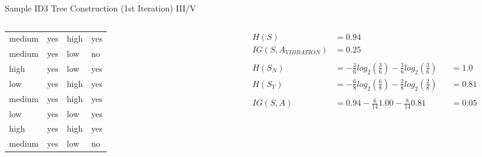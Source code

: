 \documentclass[document.tex]{subfiles}
\begin{document}
\begin{frame}{Sample ID3 Tree Construction (1st Iteration) III/V}
\begin{columns}
\begin{column}{0.4\textwidth}
\begin{table}
{\begin{tabular}{llll}
                            \rowcolor{LightGreen}
                            medium &   yes &        high &    yes \\
                            \rowcolor{LightRed}
                            medium &   yes &         low &     no \\
                            \rowcolor{LightGreen}
                            high &   yes &         low &    yes \\
                            \rowcolor{LightGreen}
                            low &   yes &        high &    yes \\
                            \rowcolor{LightGreen}
                            medium &   yes &        high &    yes \\
                            \rowcolor{LightGreen}
                            low &   yes &         low &    yes \\
                            \rowcolor{LightGreen}
                            high &   yes &        high &    yes \\
                            \rowcolor{LightRed}
                            medium &   yes &         low &     no \\
                            \bottomrule
                        \end{tabular}
                    }
                \end{table}
            \end{column}
            \begin{column}{0.6\textwidth}
                \begin{alignat*}{3}
                    H(S) &= 0.94 \\
                    IG(S, A_{VIBRATION}) &= 0.25 \\\\
                    H(S_N) &= -\frac{3}{6}log_2(\frac{3}{6}) - \frac{3}{6}log_2(\frac{3}{6}) &&= 1.0 \\
                    H(S_Y) &= -\frac{6}{8}log_2(\frac{6}{8}) - \frac{2}{8}log_2(\frac{2}{8}) &&= 0.81 \\\\
                    IG(S, A) &= 0.94 - \frac{6}{14} 1.00 - \frac{8}{14} 0.81 &&= 0.05
                \end{alignat*}
            \end{column}
        \end{columns}
    \end{frame}	
                
\end{document}
